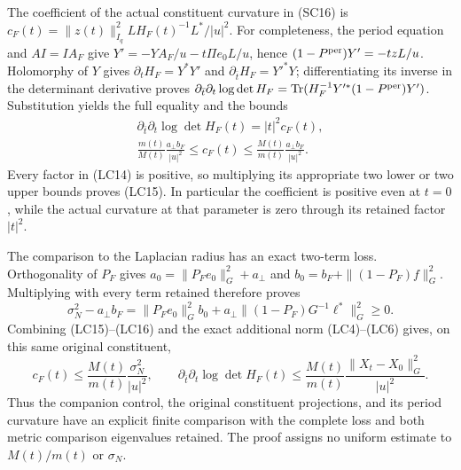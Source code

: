 The coefficient of the actual constituent curvature in (SC16) is
$c_F(t)=\|z(t)\|_{I_q}^2 L H_F(t)^{-1}L^*/|u|^2$.
For completeness, the period equation and $AI=IA_F$ give
$Y'=-YA_F/u-t\Pi e_0L/u$, hence
$(1-P^{\rm per})Y'=-tzL/u$.
Holomorphy of $Y$ gives $\partial_tH_F=Y^*Y'$ and
$\partial_{\bar t}H_F=Y'^*Y$; differentiating its inverse in
the determinant derivative proves
$\partial_{\bar t}\partial_t\log\det H_F
=\operatorname{Tr}(H_F^{-1}Y'^*(1-P^{\rm per})Y')$.
Substitution yields the full equality and the bounds
\[
\begin{gathered}
 \partial_{\bar t}\partial_t\log\det H_F(t)=|t|^2c_F(t),\\
 \boxed{\frac{m(t)}{M(t)}\frac{a_\perp b_F}{|u|^2}
       \le c_F(t)\le
       \frac{M(t)}{m(t)}\frac{a_\perp b_F}{|u|^2}.}
\end{gathered}\tag{LC15}
\]
Every factor in (LC14) is positive, so multiplying its appropriate
two lower or two upper bounds proves (LC15). In particular the
coefficient is positive even at $t=0$, while the actual curvature
at that parameter is zero through its retained factor $|t|^2$.

The comparison to the Laplacian radius has an exact two-term loss.
Orthogonality of $P_F$ gives
$a_0=\|P_Fe_0\|_G^2+a_\perp$ and
$b_0=b_F+\|(1-P_F)f\|_G^2$. Multiplying with every term
retained therefore proves
\[
 \boxed{\sigma_N^2-a_\perp b_F
  =\|P_Fe_0\|_G^2 b_0
      +a_\perp\|(1-P_F)G^{-1}\ell^*\|_G^2\ge0.}
 \tag{LC16}
\]
Combining (LC15)--(LC16) and the exact additional norm (LC4)--(LC6)
gives, on this same original constituent,
\[
 c_F(t)\le\frac{M(t)}{m(t)}\frac{\sigma_N^2}{|u|^2},\qquad
 \partial_{\bar t}\partial_t\log\det H_F(t)
 \le\frac{M(t)}{m(t)}
           \frac{\|X_t-X_0\|_G^2}{|u|^2}.
\]
Thus the companion control, the original constituent projections,
and its period curvature have an explicit finite comparison with
the complete loss and both metric comparison eigenvalues retained.
The proof assigns no uniform estimate to $M(t)/m(t)$ or $\sigma_N$.


\endgroup
